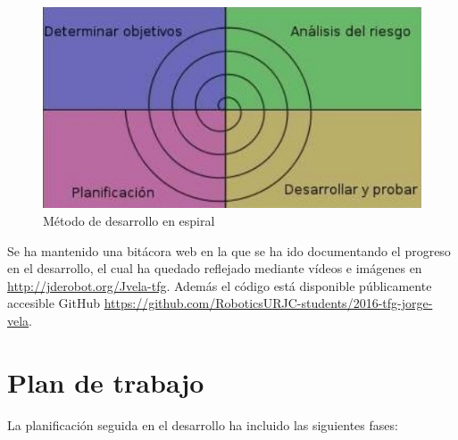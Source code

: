 \begin{figure}[H]
	\centering
		\includegraphics{imgs/metodologia-espiral.jpg}
        \caption{M\'etodo de desarrollo en espiral}
	\label{fig:Desarrollo en espiral}
\end{figure}

\hspace{1 cm} Se ha mantenido una bit\'acora web en la que se ha ido documentando el progreso en el desarrollo, el cual ha quedado reflejado mediante v\'ideos e im\'agenes en \href{http://jderobot.org/Jvela-tfg}{http://jderobot.org/Jvela-tfg}. Adem\'as el c\'odigo est\'a disponible p\'ublicamente accesible GitHub \href{https://github.com/RoboticsURJC-students/2016-tfg-jorge-vela}{https://github.com/RoboticsURJC-students/2016-tfg-jorge-vela}.


\section{Plan de trabajo}
La planificaci\'on seguida en el desarrollo ha incluido las siguientes fases:

